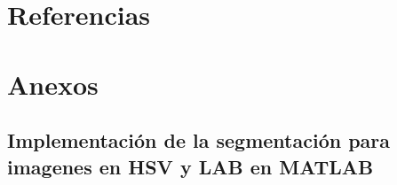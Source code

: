 \documentclass[11pt, letterpaper]{article}
\begin{document}
\newpage

	
\section{Referencias}  %

\newpage
	
\section{Anexos}	
\subsection{Implementación de la segmentación para imagenes en HSV y LAB en MATLAB}
\end{document}
